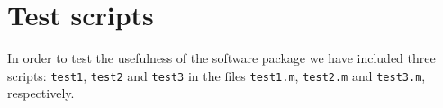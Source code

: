 \documentclass[a4paper,10pt]{report}
\begin{document}
\section{Test scripts}

In order to test the usefulness of the software package we have included three scripts:
\verb"test1", \verb"test2" and \verb"test3" in the files \verb"test1.m", \verb"test2.m" 
and \verb"test3.m", respectively.


%

\end{document}
